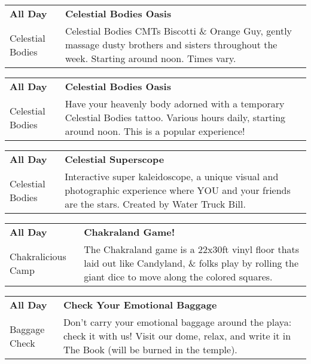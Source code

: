 \begin{tabular}{ p{1in} p{2.2in} }
    \textbf{All Day} & \textbf{Celestial Bodies Oasis} \\
    Celestial Bodies \newline  & Celestial Bodies CMTs Biscotti \& Orange Guy, gently massage dusty brothers and sisters throughout the week. Starting around noon. Times vary. \\
    \hline 
\end{tabular}
    
\begin{tabular}{ p{1in} p{2.2in} }
    \textbf{All Day} & \textbf{Celestial Bodies Oasis} \\
    Celestial Bodies \newline  & Have your heavenly body adorned with a temporary Celestial Bodies tattoo. Various hours daily, starting around noon. This is a popular experience! \\
    \hline 
\end{tabular}
    
\begin{tabular}{ p{1in} p{2.2in} }
    \textbf{All Day} & \textbf{Celestial Superscope} \\
    Celestial Bodies \newline  & Interactive super kaleidoscope, a unique visual and photographic experience where YOU and your friends are the stars. Created by Water Truck Bill. \\
    \hline 
\end{tabular}
    
\begin{tabular}{ p{1in} p{2.2in} }
    \textbf{All Day} & \textbf{Chakraland Game!} \\
    Chakralicious Camp \newline  & The Chakraland game is a 22x30ft vinyl floor thats laid out like Candyland, \& folks play by rolling the giant dice to move along the colored squares. \\
    \hline 
\end{tabular}
    
\begin{tabular}{ p{1in} p{2.2in} }
    \textbf{All Day} & \textbf{Check Your Emotional Baggage} \\
    Baggage Check \newline  & Don't carry your emotional baggage around the playa: check it with us! Visit our dome, relax, and write it in The Book (will be burned in the temple). \\
    \hline 
\end{tabular}
    
